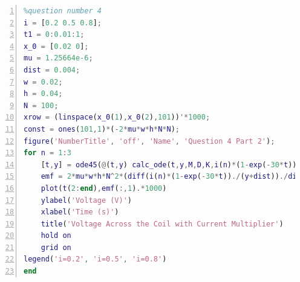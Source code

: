 \documentclass[conference]{IEEEtran}
\begin{document}
\begin{lstlisting}[language=matlab, numbers=left, xleftmargin=\parindent, caption=Full MATLAB code used in the activity]
%% 
%question number 4
i = [0.2 0.5 0.8];
t1 = 0:0.01:1;
x_0 = [0.02 0];
mu = 1.25664e-6;
dist = 0.004;
w = 0.02;
h = 0.04;
N = 100;
xrow = (linspace(x_0(1),x_0(2),101))'*1000;
const = ones(101,1)*(-2*mu*w*h*N*N);
figure('NumberTitle', 'off', 'Name', 'Question 4 Part 2');
for n = 1:3 
    [t,y] = ode45(@(t,y) calc_ode(t,y,M,D,K,i(n)*(1-exp(-30*t))), t1, x_0);
    emf = 2*mu*w*h*N^2*(diff(i(n)*(1-exp(-30*t))./(y+dist))./diff(t));
    plot(t(2:end),emf(:,1).*1000)
    ylabel('Voltage (V)')
    xlabel('Time (s)')
    title('Voltage Across the Coil with Current Multiplier')
    hold on
    grid on
legend('i=0.2', 'i=0.5', 'i=0.8')
end

\end{lstlisting}
\end{document}
